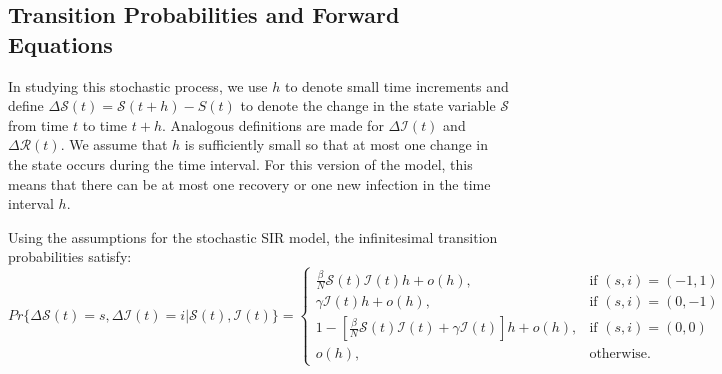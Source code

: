 \documentclass[reqno,11pt]{amsart}
\begin{document}
\subsection{Transition Probabilities and Forward Equations}
In studying this stochastic process, we use $h$ to denote small time increments and define $\Delta \mathcal S(t) = \mathcal S(t+h) - S(t)$ to denote the change in the state variable $\mathcal S$ from time $t$ to time $t+h$. Analogous definitions are made for $\Delta \mathcal I(t)$ and $\Delta \mathcal R(t)$. We assume that $h$ is sufficiently small so that at most one change in the state occurs during the time interval. For this version of the model, this means that there can be at most one recovery or one new infection in the time interval $h$.

Using the assumptions for the stochastic SIR model, the infinitesimal transition probabilities satisfy:
\begin{equation*}
Pr \lbrace \Delta \mathcal S(t) = s, \Delta \mathcal I(t) = i | \mathcal S(t), \mathcal I(t)  \rbrace = 
\begin{cases}
	\frac{\beta}{N} \mathcal S(t) \mathcal I(t) h + o(h),  							&  \text{if $(s,i) = (-1,1)$ } 	\\
	\gamma \mathcal I(t) h+o(h),											&  \text{if $(s,i) = (0,-1)$ } 	\\
	1 - \left[ \frac{\beta}{N} \mathcal S(t)  \mathcal I(t) + \gamma \mathcal I(t) \right ] h + o(h), 		&  \text{if $(s,i) = (0,0)$ } 	\\
	o(h),														&  \text{otherwise.}
\end{cases}
\end{equation*} 


\end{document}
